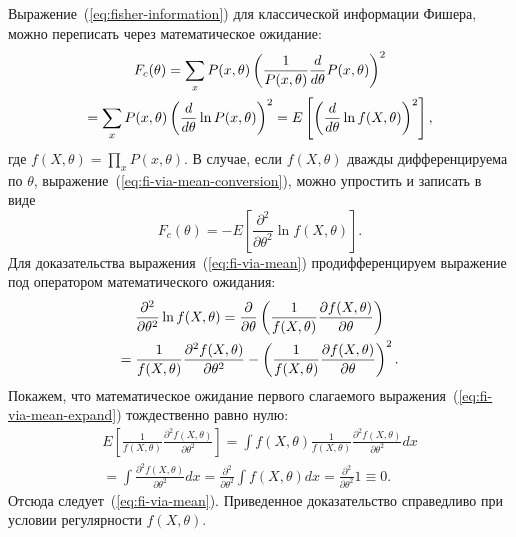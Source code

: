 Выражение~(\ref{eq:fisher-information}) для классической информации Фишера, можно переписать через математическое ожидание:
\begin{multline}\label{eq:fi-via-mean-conversion}
    F_c(\theta)
    = \sum_x P(x, \theta)\left( \frac{1}{P(x,\theta)}\frac{d}{d \theta} P(x, \theta) \right)^2 \\
    = \sum_x P(x,\theta)\left( \frac{d}{d \theta} \ln P(x, \theta) \right)^2
    = E\left[\left( \frac{d}{d \theta}\ln f(X,\theta) \right)^2 \right],
\end{multline}
%
где $f(X,\theta) = \prod_x P(x, \theta)$.
В случае, если $f(X,\theta)$ дважды дифференцируема по $\theta$,
выражение~(\ref{eq:fi-via-mean-conversion}), можно упростить и записать в виде
%
\begin{equation}\label{eq:fi-via-mean}
  F_c(\theta) = -E \left[\frac{\partial^2}{\partial \theta^2} \ln f(X,\theta)\right].
\end{equation}
%
Для доказательства выражения~(\ref{eq:fi-via-mean})
продифференцируем выражение под оператором математического ожидания:
%
\begin{multline}\label{eq:fi-via-mean-expand}
  \frac{\partial^2}{\partial \theta^2}\ln f(X,\theta)
  = \frac{\partial}{\partial \theta}\left( \frac{1}{f(X,\theta)}
    \frac{\partial f(X,\theta)}{\partial \theta}  \right) \\
  = \frac{1}{f(X,\theta)}\frac{\partial^2 f(X,\theta)}{\partial \theta^2}
  - \left( \frac{1}{f(X,\theta)} \frac{\partial f(X,\theta)}{\partial \theta} \right)^2.
\end{multline}
%
Покажем,
что математическое ожидание первого слагаемого выражения~(\ref{eq:fi-via-mean-expand}) тождественно равно нулю:
%
\begin{multline}\label{eq:fi-via-mean-proof}
  E\left[\frac{1}{f(X,\theta)}
    \frac{\partial^2 f(X,\theta)}{\partial \theta^2}\right]
  = \int f (X,\theta) \frac{1}{f(X,\theta)}
    \frac{\partial^2 f(X, \theta)}{\partial \theta^2}dx \\
  = \int \frac{\partial^2 f(X,\theta)}{\partial \theta^2}dx
  = \frac{\partial^2}{\partial \theta^2} \int f(X,\theta)dx
  = \frac{\partial^2}{\partial \theta^2}1
  \equiv 0.
\end{multline}
%
Отсюда следует~(\ref{eq:fi-via-mean}).
Приведенное доказательство справедливо при условии регулярности $f(X,\theta)$.


